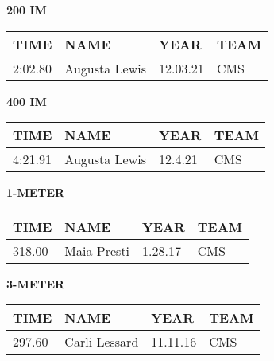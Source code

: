 \begin{minipage}[t]{0.48\textwidth}
\centering
\textbf{200 IM}\\[0.05cm]
\begin{tabular}{@{}p{1.8cm}p{2.8cm}p{1.2cm}p{1.4cm}@{}}
\hline
\textbf{TIME} & \textbf{NAME} & \textbf{YEAR} & \textbf{TEAM} \\
\hline
2:02.80 & Augusta Lewis & 12.03.21 & CMS \\
\hline
\end{tabular}
\end{minipage}\hfill
\begin{minipage}[t]{0.48\textwidth}
\centering
\textbf{400 IM}\\[0.05cm]
\begin{tabular}{@{}p{1.8cm}p{2.8cm}p{1.2cm}p{1.4cm}@{}}
\hline
\textbf{TIME} & \textbf{NAME} & \textbf{YEAR} & \textbf{TEAM} \\
\hline
4:21.91 & Augusta Lewis & 12.4.21 & CMS \\
\hline
\end{tabular}
\end{minipage}

\vspace{0.4cm}

\begin{center}
\begin{minipage}[t]{0.7\textwidth}
\centering
\textbf{1-METER}\\[0.05cm]
\begin{tabular}{@{}p{1.8cm}p{2.8cm}p{1.2cm}p{1.4cm}@{}}
\hline
\textbf{TIME} & \textbf{NAME} & \textbf{YEAR} & \textbf{TEAM} \\
\hline
318.00 & Maia Presti & 1.28.17 & CMS \\
\hline
\end{tabular}
\end{minipage}
\end{center}

\vspace{0.4cm}

\begin{center}
\begin{minipage}[t]{0.7\textwidth}
\centering
\textbf{3-METER}\\[0.05cm]
\begin{tabular}{@{}p{1.8cm}p{2.8cm}p{1.2cm}p{1.4cm}@{}}
\hline
\textbf{TIME} & \textbf{NAME} & \textbf{YEAR} & \textbf{TEAM} \\
\hline
297.60 & Carli Lessard & 11.11.16 & CMS \\
\hline
\end{tabular}
\end{minipage}
\end{center}

